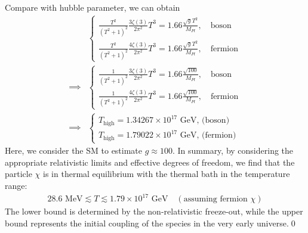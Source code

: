 Compare with hubble parameter, we can obtain
\begin{align}
    &\begin{cases}
        \frac{T^2}{(T^2+1)^2} \frac{3\zeta(3)}{2\pi^2}T^3=1.66\frac{\sqrt{g}T^2}{M_{Pl}},\quad\text{boson}\\
        \frac{T^2}{(T^2+1)^2} \frac{4\zeta(3)}{2\pi^2}T^3 = 1.66\frac{\sqrt{g}T^2}{M_{Pl}},\quad\text{fermion}
    \end{cases}\\
    \implies&\begin{cases}
        \frac{1}{(T^2+1)^2} \frac{3\zeta(3)}{2\pi^2}T^3=1.66\frac{\sqrt{100}}{M_{Pl}},\quad\text{boson}\\
        \frac{1}{(T^2+1)^2} \frac{4\zeta(3)}{2\pi^2}T^3 = 1.66\frac{\sqrt{100}}{M_{Pl}},\quad\text{fermion}
    \end{cases}\\
    \implies&\begin{cases}
        T_\text{high}=1.34267\times10^{17} \text{ GeV, (boson)} \\
        T_\text{high}=1.79022\times10^{17} \text{ GeV, (fermion)} 
    \end{cases}
\end{align}
Here, we consider the SM to estimate $g\approx100$. In summary, by considering the appropriate relativistic limits and effective degrees of freedom, we find that the particle $\chi$ is in thermal equilibrium with the thermal bath in the temperature range:
\begin{align}
28.6 \text{ MeV} \lesssim T \lesssim 1.79 \times 10^{17} \text{ GeV} \quad (\text{assuming fermion } \chi)
\end{align}
The lower bound is determined by the non-relativistic freeze-out, while the upper bound represents the initial coupling of the species in the very early universe.\qed